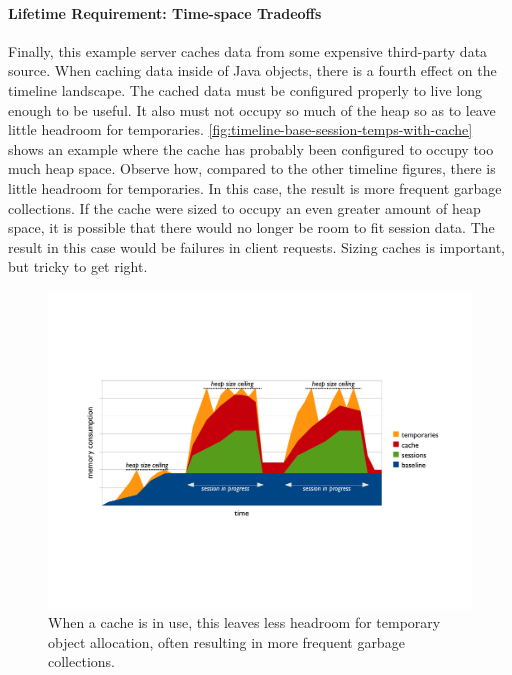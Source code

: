 \paragraph{Lifetime Requirement: Time-space Tradeoffs}
Finally, this example server caches data from some expensive third-party data
source. When caching data inside of Java objects, there is a fourth effect on
the timeline landscape. The
cached data must be configured properly to live long enough to be useful. It
also must not occupy so much of the heap so as to leave little headroom for
temporaries. \autoref{fig:timeline-base-session-temps-with-cache} shows an
example where the cache has probably been configured to occupy too much heap
space. Observe how, compared to the other timeline figures, there is little
headroom for temporaries. In this case, the result is more frequent garbage
collections. If the cache were sized to occupy an even greater amount of heap
space, it is possible that there would no longer be room to fit session data.
The result in this case would be failures in client requests. 
Sizing caches is important, but tricky to get right.

\begin{figure}
	\centering
	\includegraphics[width=\textwidth]{part4/Figures/lifetime/timeline-base-session-temps-with-cache}
	\caption{When a cache is in use, this leaves less headroom for temporary
	object allocation, often resulting in more frequent garbage collections.}
	\label{fig:timeline-base-session-temps-with-cache}
\end{figure}


